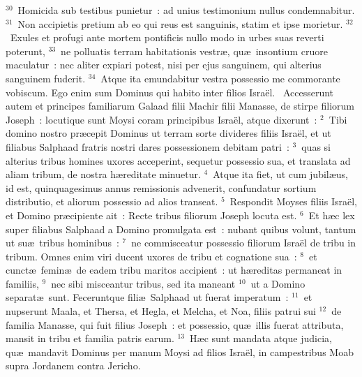 ${}^{30}$~Homicida sub testibus punietur~: ad unius testimonium nullus condemnabitur.
${}^{31}$~Non accipietis pretium ab eo qui reus est sanguinis, statim et ipse morietur.
${}^{32}$~Exules et profugi ante mortem pontificis nullo modo in urbes suas reverti poterunt,
${}^{33}$~ne polluatis terram habitationis vestr\ae , qu\ae\ insontium cruore maculatur~: nec aliter expiari potest, nisi per ejus sanguinem, qui alterius sanguinem fuderit.
${}^{34}$~Atque ita emundabitur vestra possessio me commorante vobiscum. Ego enim sum Dominus qui habito inter filios Isra\"el.
~Accesserunt autem et principes familiarum Galaad filii Machir filii Manasse, de stirpe filiorum Joseph~: locutique sunt Moysi coram principibus Isra\"el, atque dixerunt~:
${}^{2}$~Tibi domino nostro pr\ae cepit Dominus ut terram sorte divideres filiis Isra\"el, et ut filiabus Salphaad fratris nostri dares possessionem debitam patri~:
${}^{3}$~quas si alterius tribus homines uxores acceperint, sequetur possessio sua, et translata ad aliam tribum, de nostra h\ae reditate minuetur.
${}^{4}$~Atque ita fiet, ut cum jubil\ae us, id est, quinquagesimus annus remissionis advenerit, confundatur sortium distributio, et aliorum possessio ad alios transeat.
${}^{5}$~Respondit Moyses filiis Isra\"el, et Domino pr\ae cipiente ait~: Recte tribus filiorum Joseph locuta est.
${}^{6}$~Et h\ae c lex super filiabus Salphaad a Domino promulgata est~: nubant quibus volunt, tantum ut su\ae\ tribus hominibus~:
${}^{7}$~ne commisceatur possessio filiorum Isra\"el de tribu in tribum. Omnes enim viri ducent uxores de tribu et cognatione sua~:
${}^{8}$~et cunct\ae\ femin\ae\ de eadem tribu maritos accipient~: ut h\ae reditas permaneat in familiis,
${}^{9}$~nec sibi misceantur tribus, sed ita maneant
${}^{10}$~ut a Domino separat\ae\ sunt. Feceruntque fili\ae\ Salphaad ut fuerat imperatum~:
${}^{11}$~et nupserunt Maala, et Thersa, et Hegla, et Melcha, et Noa, filiis patrui sui
${}^{12}$~de familia Manasse, qui fuit filius Joseph~: et possessio, qu\ae\ illis fuerat attributa, mansit in tribu et familia patris earum.
${}^{13}$~H\ae c sunt mandata atque judicia, qu\ae\ mandavit Dominus per manum Moysi ad filios Isra\"el, in campestribus Moab supra Jordanem contra Jericho.
